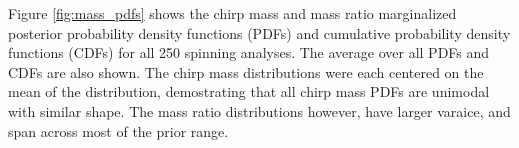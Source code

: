 Figure \ref{fig:mass_pdfs} shows the chirp mass and mass ratio marginalized posterior probability density functions (PDFs) and cumulative probability density functions (CDFs) for all 250 spinning analyses.  The average over all PDFs and CDFs are also shown.  The chirp mass distributions were each centered on the mean of the distribution, demostrating that all chirp mass PDFs are unimodal with similar shape.  The mass ratio distributions however, have larger varaice, and span across most of the prior range.